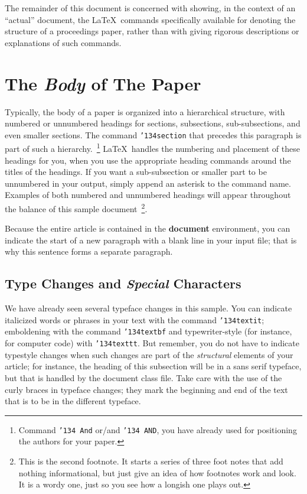 \documentclass[article]{stucosrec}
\begin{document}
	The remainder of this document is concerned with showing, in the context of an ``actual'' document, the \LaTeX\ commands specifically available for denoting the structure of a proceedings paper, rather than with giving rigorous descriptions or explanations of such commands.
	
	\section{The \textit{Body} of The Paper}
	
	Typically, the body of a paper is organized into a hierarchical structure, with numbered or unnumbered headings for sections, subsections, sub-subsections, and even smaller sections.
	The command \texttt{{\char'134}section} that precedes this paragraph is part of such a hierarchy.~\footnote{Command {\texttt{\char'134 And}} or/and {\texttt{\char'134 AND}}, you have already used for positioning the authors for your paper.} \LaTeX\ handles the numbering and placement of these headings for you, when you use the appropriate heading commands around the titles of the headings.
	If you want a sub-subsection or smaller part to be unnumbered in your output, simply append an asterisk to the command name.
	Examples of both numbered and unnumbered headings will appear throughout the balance of this sample document~\footnote{This is the second footnote. It starts a series of three foot notes that add nothing informational, but just give an idea
of how footnotes work and look. It is a wordy one, just so
you see how a longish one plays out.}.
	
	Because the entire article is contained in the \textbf{document} environment, you can indicate the start of a new paragraph with a blank line in your input file; that is why this sentence forms a separate paragraph.
	
	\subsection{Type Changes and \textit{Special} Characters}
	
	We have already seen several typeface changes in this sample.
	You can indicate italicized words or phrases in your text with the command \texttt{{\char'134}textit}; emboldening with the command \texttt{{\char'134}textbf} and typewriter-style (for instance, for computer code) with \texttt{{\char'134}texttt}.
	But remember, you do not have to indicate typestyle changes when such changes are part of the \textit{structural} elements of your 	article; for instance, the heading of this subsection will be in a sans serif typeface, but that is handled by the document class file. Take care with the use of the curly braces in typeface changes; they mark the beginning and end of the text that is to be in the different typeface.
	
\end{document}

